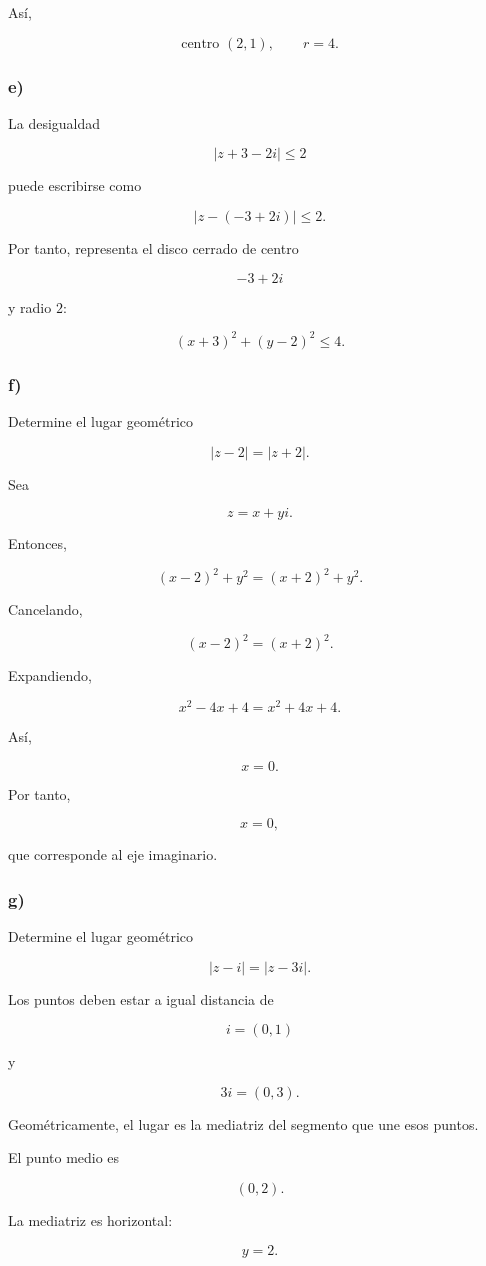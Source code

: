 \documentclass[12pt]{article}
\begin{document}
Así,

\[
\boxed{
\text{centro }(2,1),
\qquad
r=4
}.
\]

\subsubsection*{e)}

La desigualdad

\[
|z+3-2i|\leq2
\]

puede escribirse como

\[
|z-(-3+2i)|\leq2.
\]

Por tanto, representa el disco cerrado de centro

\[
-3+2i
\]

y radio \(2\):

\[
\boxed{
(x+3)^2+(y-2)^2\leq4
}.
\]

\subsubsection*{f)}

Determine el lugar geométrico

\[
|z-2|=|z+2|.
\]

Sea

\[
z=x+yi.
\]

Entonces,

\[
(x-2)^2+y^2
=
(x+2)^2+y^2.
\]

Cancelando,

\[
(x-2)^2=(x+2)^2.
\]

Expandiendo,

\[
x^2-4x+4
=
x^2+4x+4.
\]

Así,

\[
x=0.
\]

Por tanto,

\[
\boxed{x=0},
\]

que corresponde al eje imaginario.

\subsubsection*{g)}

Determine el lugar geométrico

\[
|z-i|=|z-3i|.
\]

Los puntos deben estar a igual distancia de

\[
i=(0,1)
\]

y

\[
3i=(0,3).
\]

Geométricamente, el lugar es la mediatriz del segmento que une esos
puntos.

El punto medio es

\[
(0,2).
\]

La mediatriz es horizontal:

\[
\boxed{y=2}.
\]
\end{document}
